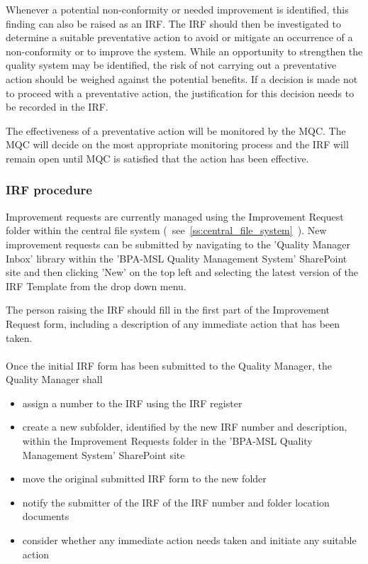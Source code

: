 Whenever a potential non-conformity or needed improvement is identified, this finding can also be raised as an IRF. The IRF should then be investigated to determine a suitable preventative action to avoid or mitigate an occurrence of a non-conformity or to improve the system. While an opportunity to strengthen the quality system may be identified, the risk of not carrying out a preventative action should be weighed against the potential benefits. If a decision is made not to proceed with a preventative action, the justification for this decision needs to be recorded in the IRF.

The effectiveness of a preventative action will be monitored by the MQC. The MQC will decide on the most appropriate monitoring process and the IRF will remain open until MQC is satisfied that the action has been effective. 

\subsubsection{IRF procedure}
\label{sss:irf_procedure}
Improvement requests are currently managed using the Improvement Request folder within the central file system (~see~\ref{ss:central_file_system}~). 
New improvement requests can be submitted by navigating to the 'Quality Manager Inbox' library within the 'BPA-MSL Quality Management System' SharePoint site and then clicking 'New' on the top left and selecting the latest version of the IRF Template from the drop down menu.

The person raising the IRF should fill in the first part of the Improvement Request form, including a description of any immediate action that has been taken. \\
\\
Once the initial IRF form has been submitted to the Quality Manager, the Quality Manager shall
\begin{itemize} 
\item assign a number to the IRF using the IRF register
\item create a new subfolder, identified by the new IRF number and description, within the Improvement Requests folder in the 'BPA-MSL Quality Management System' SharePoint site
\item move the original submitted IRF form to the new folder
\item notify the submitter of the IRF of the IRF number and folder location documents
\item consider whether any immediate action needs taken and initiate any suitable action
\end{itemize}


